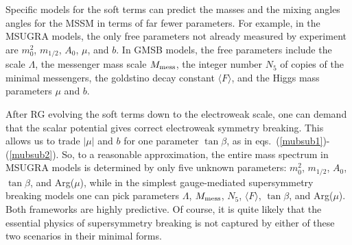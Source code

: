 \documentclass[11pt]{article}
\def\nmess{N_5}
\begin{document}
Specific models for the soft 
terms can predict the masses and the mixing angles angles for the 
MSSM in terms of far fewer parameters. For example, 
in the MSUGRA models, the only free 
parameters not already measured by 
experiment are $m_0^2$, $m_{1/2}$, $A_0$, $\mu$, and $b$. In 
GMSB models, the free parameters include 
the scale $\Lambda$, the messenger mass scale $M_{\rm mess}$, 
the integer number $\nmess$ of copies of the minimal messengers, 
the goldstino decay constant $\langle F \rangle $, and the Higgs mass 
parameters $\mu$ and $b$. 

After RG evolving the soft terms down to the 
electroweak scale, one can demand that the scalar potential gives correct 
electroweak symmetry breaking. This allows us to trade $|\mu|$ and $b$ 
for one parameter $\tan\beta$, as in 
eqs.~(\ref{mubsub1})-(\ref{mubsub2}). So, to a reasonable approximation, 
the entire mass spectrum in MSUGRA models is determined by 
only five unknown parameters: $m_0^2$, $m_{1/2}$, $A_0$, $\tan\beta$, and 
Arg($\mu$), while in the simplest gauge-mediated supersymmetry breaking 
models one can pick parameters $\Lambda$, $M_{\rm mess}$, $\nmess$, 
$\langle F \rangle $, $\tan\beta$, and Arg($\mu$). Both frameworks are 
highly predictive. Of course, it is quite likely that the essential 
physics of supersymmetry breaking is not captured by either of these two 
scenarios in their minimal forms. 
\end{document}
